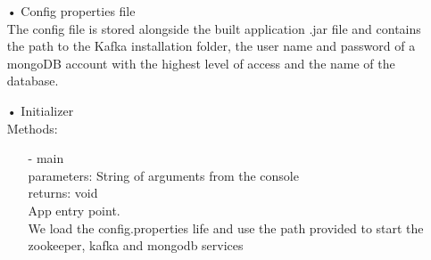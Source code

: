 \documentclass[oneside, english, final]{design}
\begin{document}
\begin{itemize}

	\item[•] Config properties file
	      \\The config file is stored alongside the built application .jar file and contains the path to the Kafka installation folder, the user name and password of a mongoDB account with the highest level of access and the name of the database.

	\item[•]Initializer
	      \\Methods:
	      \begin{itemize}
		      \item[-]main
		            \\ parameters: String of arguments from the console
		            \\ returns: void
		            \\ App entry point.
		            \\ We load the config.properties life and use the path provided to start the zookeeper, kafka and mongodb services
	      \end{itemize}



\end{itemize}
\end{document}
